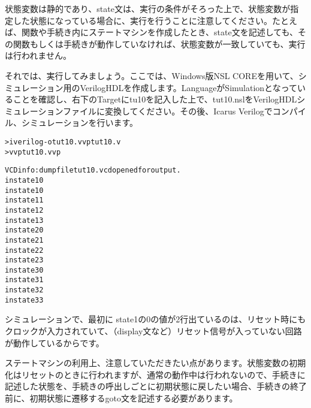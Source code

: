 状態変数は静的であり、state文は、実行の条件がそろった上で、状態変数が指定した状態になっている場合に、実行を行うことに注意してください。たとえば、関数や手続き内にステートマシンを作成したとき、state文を記述しても、その関数もしくは手続きが動作していなければ、状態変数が一致していても、実行は行われません。

それでは、実行してみましょう。ここでは、Windows版NSL COREを用いて、シミュレーション用のVerilogHDLを作成します。LanguageがSimulationとなっていることを確認し、右下のTargetにtu10を記入した上で、tut10.nslをVerilogHDLシミュレーションファイルに変換してください。その後、Icarus Verilogでコンパイル、シミュレーションを行います。

\begin{reviewcmd}
\begin{alltt}
\textgreater{} iverilog -otut10.vvp tut10.v
\textgreater{} vvp tut10.vvp

VCD info: dumpfile tut10.vcd opened for output.
in state1 0
in state1 0
in state1 1
in state1 2
in state1 3
in state2 0
in state2 1
in state2 2
in state2 3
in state3 0
in state3 1
in state3 2
in state3 3
\end{alltt}
\end{reviewcmd}

シミュレーションで、最初に state1の0の値が2行出ているのは、リセット時にもクロックが入力されていて、（\textunderscore{}display文など）リセット信号が入っていない回路が動作しているからです。

ステートマシンの利用上、注意していただきたい点があります。状態変数の初期化はリセットのときに行われますが、通常の動作中は行われないので、手続きに記述した状態を、手続きの呼出しごとに初期状態に戻したい場合、手続きの終了前に、初期状態に遷移するgoto文を記述する必要があります。
